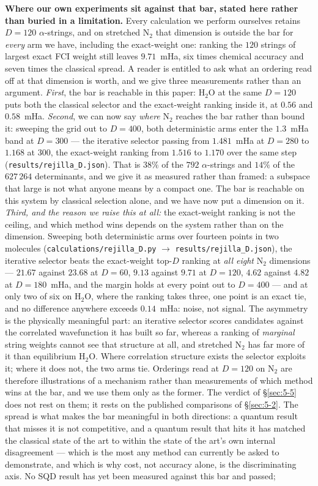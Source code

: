 \documentclass[onecolumn,a4paper]{quantumarticle}
\begin{document}
\textbf{Where our own experiments sit against that bar, stated here rather than buried in a limitation.} Every calculation we perform ourselves retains $D{=}120$ $\alpha$-strings, and on stretched N$_2$ that dimension is outside the bar for \emph{every} arm we have, including the exact-weight one: ranking the $120$ strings of largest exact FCI weight still leaves $9.71$~mHa, six times chemical accuracy and seven times the classical spread. A reader is entitled to ask what an ordering read off at that dimension is worth, and we give three measurements rather than an argument. \emph{First}, the bar is reachable in this paper: H$_2$O at the same $D{=}120$ puts both the classical selector and the exact-weight ranking inside it, at $0.56$ and $0.58$~mHa. \emph{Second}, we can now say \emph{where} N$_2$ reaches the bar rather than bound it: sweeping the grid out to $D{=}400$, both deterministic arms enter the $1.3$~mHa band at $D{=}300$ --- the iterative selector passing from $1.481$~mHa at $D{=}280$ to $1.168$ at $300$, the exact-weight ranking from $1.516$ to $1.170$ over the same step (\texttt{results/rejilla\_D.json}). That is $38\%$ of the $792$ $\alpha$-strings and $14\%$ of the $627\,264$ determinants, and we give it as measured rather than framed: a subspace that large is not what anyone means by a compact one. The bar is reachable on this system by classical selection alone, and we have now put a dimension on it. \emph{Third, and the reason we raise this at all:} the exact-weight ranking is not the ceiling, and which method wins depends on the system rather than on the dimension. Sweeping both deterministic arms over fourteen points in two molecules (\texttt{calculations/rejilla\_D.py} $\to$ \texttt{results/rejilla\_D.json}), the iterative selector beats the exact-weight top-$D$ ranking at \emph{all eight} N$_2$ dimensions --- $21.67$ against $23.68$ at $D{=}60$, $9.13$ against $9.71$ at $D{=}120$, $4.62$ against $4.82$ at $D{=}180$~mHa, and the margin holds at every point out to $D{=}400$ --- and at only two of six on H$_2$O, where the ranking takes three, one point is an exact tie, and no difference anywhere exceeds $0.14$~mHa: noise, not signal. The asymmetry is the physically meaningful part: an iterative selector scores candidates against the correlated wavefunction it has built so far, whereas a ranking of \emph{marginal} string weights cannot see that structure at all, and stretched N$_2$ has far more of it than equilibrium H$_2$O. Where correlation structure exists the selector exploits it; where it does not, the two arms tie. Orderings read at $D{=}120$ on N$_2$ are therefore illustrations of a mechanism rather than measurements of which method wins at the bar, and we use them only as the former. The verdict of \S\ref{sec:5-5} does not rest on them; it rests on the published comparisons of \S\ref{sec:5-2}. The spread is what makes the bar meaningful in both directions: a quantum result that misses it is not competitive, and a quantum result that hits it has matched the classical state of the art to within the state of the art's own internal disagreement --- which is the most any method can currently be asked to demonstrate, and which is why cost, not accuracy alone, is the discriminating axis. No SQD result has yet been measured against this bar and passed; 
\end{document}
